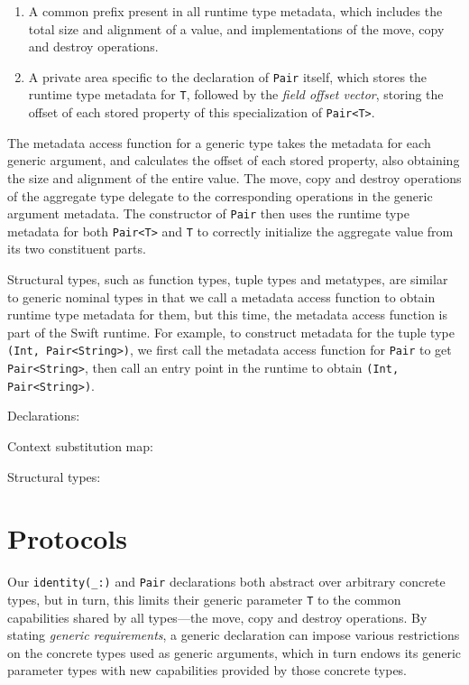 \documentclass[../generics]{subfiles}
\begin{document}
\begin{enumerate}
\item A common prefix present in all runtime type metadata, which includes the total size and alignment of a value, and implementations of the move, copy and destroy operations.
\item A private area specific to the declaration of \texttt{Pair} itself, which stores the runtime type metadata for \texttt{T}, followed by the \emph{field offset vector}, storing the offset of each stored property of this specialization of \texttt{Pair<T>}.
\end{enumerate}

The metadata access function for a generic type takes the metadata for each generic argument, and calculates the offset of each stored property, also obtaining the size and alignment of the entire value. The move, copy and destroy operations of the aggregate type delegate to the corresponding operations in the generic argument metadata. The constructor of \texttt{Pair} then uses the runtime type metadata for both \texttt{Pair<T>} and \texttt{T} to correctly initialize the aggregate value from its two constituent parts.

Structural types, such as function types, tuple types and metatypes, are similar to generic nominal types in that we call a metadata access function to obtain runtime type metadata for them, but this time, the metadata access function is part of the Swift runtime. For example, to construct metadata for the tuple type \texttt{(Int, Pair<String>)}, we first call the metadata access function for \texttt{Pair} to get \texttt{Pair<String>}, then call an entry point in the runtime to obtain \texttt{(Int, Pair<String>)}.

\begin{MoreDetails}
\item Declarations: 
\item Context substitution map: 
\item Structural types: 
\end{MoreDetails}

\section{Protocols}

Our \verb|identity(_:)| and \texttt{Pair} declarations both abstract over arbitrary concrete types, but in turn, this limits their generic parameter \texttt{T} to the common capabilities shared by all types---the move, copy and destroy operations. By stating \emph{generic requirements}, a generic declaration can impose various restrictions on the concrete types used as generic arguments, which in turn endows its generic parameter types with new capabilities provided by those concrete types.
\end{document}
